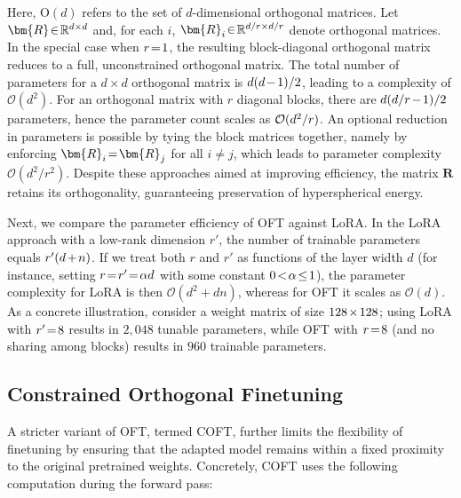 Here, $\text{O}(d)$ refers to the set of $d$-dimensional orthogonal matrices. Let $\thickmuskip=2mu \medmuskip=2mu \bm{R} \in \mathbb{R}^{d \times d}$ and, for each $i$, $\thickmuskip=2mu \medmuskip=2mu \bm{R}_i \in \mathbb{R}^{d/r \times d/r}$ denote orthogonal matrices. In the special case when $\thickmuskip=2mu \medmuskip=2mu r = 1$, the resulting block-diagonal orthogonal matrix reduces to a full, unconstrained orthogonal matrix. The total number of parameters for a $d \times d$ orthogonal matrix is $\thickmuskip=2mu \medmuskip=2mu d(d-1)/2$, leading to a complexity of $\mathcal{O}(d^2)$. For an orthogonal matrix with $r$ diagonal blocks, there are $\thickmuskip=2mu \medmuskip=2mu d(d/r-1)/2$ parameters, hence the parameter count scales as $\thickmuskip=2mu \medmuskip=2mu \mathcal{O}(d^2/r)$. An optional reduction in parameters is possible by tying the block matrices together, namely by enforcing $\thickmuskip=2mu \medmuskip=2mu\bm{R}_i = \bm{R}_j$ for all $i \neq j$, which leads to parameter complexity $\mathcal{O}(d^2/r^2)$. Despite these approaches aimed at improving efficiency, the matrix $\bm{R}$ retains its orthogonality, guaranteeing preservation of hyperspherical energy.

Next, we compare the parameter efficiency of OFT against LoRA. In the LoRA approach with a low-rank dimension $r'$, the number of trainable parameters equals $\thickmuskip=2mu \medmuskip=2mu r'(d+n)$. If we treat both $r$ and $r'$ as functions of the layer width $d$ (for instance, setting $\thickmuskip=2mu \medmuskip=2mu r = r' = \alpha d$ with some constant $\thickmuskip=2mu \medmuskip=2mu 0 < \alpha \leq 1$), the parameter complexity for LoRA is then $\mathcal{O}(d^2 + dn)$, whereas for OFT it scales as $\mathcal{O}(d)$. As a concrete illustration, consider a weight matrix of size $\thickmuskip=2mu \medmuskip=2mu 128 \times 128$; using LoRA with $\thickmuskip=2mu \medmuskip=2mu r' = 8$ results in $2,048$ tunable parameters, while OFT with $\thickmuskip=2mu \medmuskip=2mu r = 8$ (and no sharing among blocks) results in $960$ trainable parameters.

\subsection{Constrained Orthogonal Finetuning}

A stricter variant of OFT, termed COFT, further limits the flexibility of finetuning by ensuring that the adapted model remains within a fixed proximity to the original pretrained weights. Concretely, COFT uses the following computation during the forward pass:

